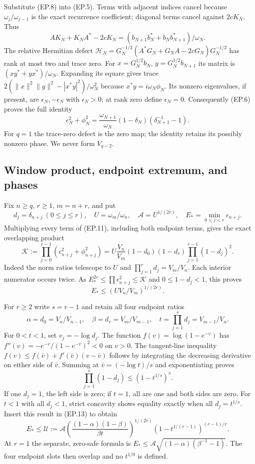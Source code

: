 Substitute (EP.8) into (EP.5). Terms with adjacent indices cancel
because $\omega_j/\omega_{j-1}$ is the exact recurrence coefficient;
diagonal terms cancel against $2cK_N$. Thus
\[
 AK_N+K_NA^*-2cK_N=
 (b_{N+1}b_N^*+b_Nb_{N+1}^*)/\omega_N.\tag{EP.10}
\]
The relative Hermitian defect
$\mathcal H_N=G_N^{-1/2}(A^*G_N+G_NA-2cG_N)G_N^{-1/2}$
has rank at most two and trace zero. For
$x=G_N^{1/2}b_N$, $y=G_N^{1/2}b_{N+1}$ its matrix is
$(xy^*+yx^*)/\omega_N$. Expanding its square gives trace
$2(\|x\|^2\|y\|^2-|x^*y|^2)/\omega_N^2$ because
$x^*y=i\omega_N\phi_N$. Its nonzero eigenvalues, if present,
are $\epsilon_N,-\epsilon_N$ with $\epsilon_N>0$; at rank zero
define $\epsilon_N=0$.
Consequently (EP.6) proves the full identity
\[
 \boxed{\epsilon_N^2+\phi_N^2=
 \frac{\omega_{N+1}}{\omega_N}(1-\delta_N)
                    (\delta_{N+1}^{-1}-1).}\tag{EP.11}
\]
For $q=1$ the trace-zero defect is the zero map; the identity retains
its possibly nonzero phase. We never form $V_{q-2}$.

\subsection{Window product, endpoint extremum, and phases}
Fix $n\ge q$, $r\ge1$, $m=n+r$, and put
\[
 d_j=\delta_{n+j}\ (0\le j\le r),\quad
 U=\omega_m/\omega_n,\quad \mathcal A=U^{1/(2r)},\quad
 E_* =\min_{0\le j<r}\epsilon_{n+j}.
\tag{EP.12}
\]
Multiplying every term of (EP.11), including both endpoint terms,
gives the exact overlapping product
\[
 \boxed{\mathcal K:=\prod_{j=0}^{r-1}(\epsilon_{n+j}^2+\phi_{n+j}^2)
 =U\frac{V_n}{V_m}(1-d_0)(1-d_r)
                 \prod_{j=1}^{r-1}(1-d_j)^2.}\tag{EP.13}
\]
Indeed the norm ratios telescope to $U$ and
$\prod_{j=1}^r d_j=V_m/V_n$. Each interior numerator occurs twice.
As $E_*^{2r}\le\prod\epsilon_{n+j}^2\le\mathcal K$ and
$0\le1-d_j<1$, this proves
\[
 E_*\le\left(UV_n/V_m\right)^{1/(2r)}.\tag{EP.14}
\]

For $r\ge2$ write $s=r-1$ and retain all four endpoint ratios
\[
 \alpha=d_0=V_n/V_{n-1},\quad
 \beta=d_r=V_m/V_{m-1},\quad t=\prod_{j=1}^s d_j=V_{m-1}/V_n.
\tag{EP.15}
\]
For $0<t<1$, set $v_j=-\log d_j$. The function
$f(v)=\log(1-e^{-v})$ has
$f''(v)=-e^{-v}/(1-e^{-v})^2<0$ on $v>0$.
The tangent-line inequality
$f(v)\le f(\bar v)+f'(\bar v)(v-\bar v)$ follows by integrating
the decreasing derivative on either side of $\bar v$. Summing at
$\bar v=(-\log t)/s$ and exponentiating proves
\[
 \prod_{j=1}^s(1-d_j)\le(1-t^{1/s})^s.\tag{EP.16}
\]
If one $d_j=1$, the left side is zero; if $t=1$, all are one and
both sides are zero. For $t<1$ with all $d_j<1$, strict concavity
shows equality exactly when all $d_j=t^{1/s}$.
Insert this result in (EP.13) to obtain
\[
 \boxed{E_*\le\mathcal U:=\mathcal A
 \left(\frac{(1-\alpha)(1-\beta)}{\beta t}\right)^{1/(2r)}
 (1-t^{1/(r-1)})^{(r-1)/r}.}\tag{EP.17}
\]
At $r=1$ the separate, zero-safe formula is
$E_*\le\mathcal A\sqrt{(1-\alpha)(\beta^{-1}-1)}$.
The four endpoint slots then overlap and no $t^{1/0}$ is defined.

